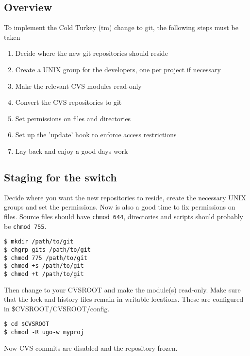 \documentclass[a4paper,10pt]{article}
\begin{document}
\subsection{Overview}
To implement the Cold Turkey (tm) change to git, the following steps must be
taken
\begin{enumerate}
  \item Decide where the new git repositories should reside
  \item Create a UNIX group for the developers, one per project if necessary
  \item Make the relevant CVS modules read-only 
  \item Convert the CVS repositories to git
  \item Set permissions	on files and directories
  \item Set up the 'update' hook to enforce access restrictions
  \item Lay back and enjoy a good days work	
\end{enumerate}

\subsection{Staging for the switch}
Decide where you want the new repositories to reside, create the necessary
UNIX groups and set the permissions. Now is also a good time to fix
permissions on files. Source files should have {\tt chmod 644}, directories
and scripts should probably be {\tt chmod 755}.
\begin{verbatim}
$ mkdir /path/to/git
$ chgrp gits /path/to/git
$ chmod 775 /path/to/git
$ chmod +s /path/to/git
$ chmod +t /path/to/git
\end{verbatim}

Then change to your CVSROOT and make the module(s) read-only. Make sure that
the lock and history files remain in writable locations. These are configured
in \$CVSROOT/CVSROOT/config.
\begin{verbatim}
$ cd $CVSROOT
$ chmod -R ugo-w myproj
\end{verbatim}
Now CVS commits are disabled and the repository frozen.
\end{document}
